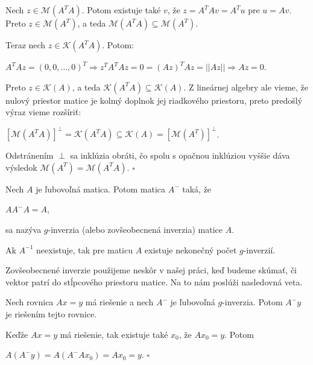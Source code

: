 \begin{dokaz}
Nech $z \in \mathcal{M}(A^T A)$. Potom existuje také $v$, že $z = A^T A v = A^T u$ pre $u = A v$.
Preto $z \in \mathcal{M}(A^T)$, a teda $\mathcal{M}(A^T A) \subseteq \mathcal{M}(A^T)$.

Teraz nech $z \in \mathcal{K}(A^T A)$. Potom:

\begin{center}
$
A^T A z = (0, 0, \ldots, 0)^T \Rightarrow z^T A^T A z = 0 = (Az)^T Az = ||Az|| \Rightarrow Az = 0
$.
\end{center}

Preto $z \in \mathcal{K}(A)$, a teda $\mathcal{K}(A^T A) \subseteq \mathcal{K}(A)$.
Z lineárnej algebry ale vieme, že nulový priestor matice je kolmý doplnok jej riadkového priestoru,
preto predošlý výraz vieme rozšíriť:
\begin{center}
$
[\mathcal{M}(A^T A)]^{\perp} = \mathcal{K}(A^T A) \subseteq \mathcal{K}(A) = [\mathcal{M}(A^T)]^{\perp}
$.
\end{center}

Odstránením $\perp$ sa inklúzia obráti, čo spolu s opačnou inklúziou vyššie dáva výsledok $\mathcal{M}(A^T) = \mathcal{M}(A^T A)$. $\square$
\end{dokaz}

\begin{defin}
Nech $A$ je ľubovoľná matica. Potom matica $A^-$ taká, že
\begin{center}
$A A^- A = A$,
\end{center}
sa nazýva $g$-inverzia (alebo zovšeobecnená inverzia) matice $A$.
\end{defin}

\begin{com}
Ak $A^{-1}$ neexistuje, tak pre maticu $A$ existuje nekonečný počet $g$-inverzií.
\end{com}

Zovšeobecnené inverzie použijeme neskôr v našej práci, keď budeme skúmať, 
či vektor patrí do stĺpcového priestoru matice. Na to nám poslúži nasledovná veta.

\begin{theorem}
\label{veta3}
Nech rovnica $Ax = y$ má riešenie a nech $A^-$ je ľubovoľná $g$-inverzia. Potom $A^- y$ je riešením tejto rovnice.
\end{theorem}

\begin{dokaz}
Keďže $Ax = y$ má riešenie, tak existuje také $x_0$, že $A x_0 = y$. Potom 
\begin{center}
$A (A^- y) = A(A^- A x_0) = A x_0 = y$. $\square$
\end{center}
\end{dokaz}

